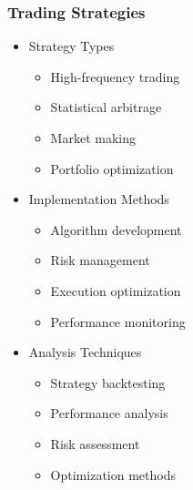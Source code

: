 \documentclass[conference]{IEEEtran}
\begin{document}
\subsubsection{Trading Strategies}
\begin{itemize}
    \item Strategy Types
    \begin{itemize}
        \item High-frequency trading
        \item Statistical arbitrage
        \item Market making
        \item Portfolio optimization
    \end{itemize}
    
    \item Implementation Methods
    \begin{itemize}
        \item Algorithm development
        \item Risk management
        \item Execution optimization
        \item Performance monitoring
    \end{itemize}
    
    \item Analysis Techniques
    \begin{itemize}
        \item Strategy backtesting
        \item Performance analysis
        \item Risk assessment
        \item Optimization methods
    \end{itemize}
\end{itemize}
\end{document}

